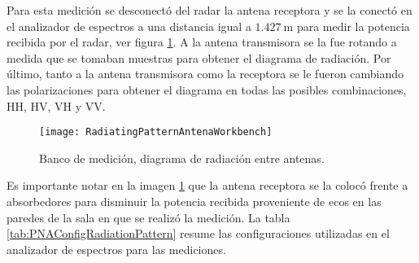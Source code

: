 Para esta medición se desconectó del radar la antena receptora y se la conectó en el analizador de espectros a una distancia igual a $\SI{1.427}{\meter}$ para medir la potencia recibida por el radar, ver figura \ref{fig:radiationPatternConnections}. A la antena transmisora se la fue rotando a medida que se tomaban muestras para obtener el diagrama de radiación. Por último, tanto a la antena transmisora como la receptora se le fueron cambiando las polarizaciones para obtener el diagrama en todas las posibles combinaciones, HH, HV, VH y VV.
\begin{figure}[htb]
 \centering
 \texttt{[image: RadiatingPatternAntenaWorkbench]}
 \caption{Banco de medición, diagrama de radiación entre antenas.}
 \label{fig:radiationPatternConnections}
\end{figure}

Es importante notar en la imagen \ref{fig:radiationPatternConnections} que la antena receptora se la colocó frente a absorbedores para disminuir la potencia recibida proveniente de ecos en las paredes de la sala en que se realizó la medición. La tabla \ref{tab:PNAConfigRadiationPattern} resume las configuraciones utilizadas en el analizador de espectros para las mediciones.

